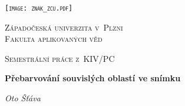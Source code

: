 \begin{titlepage}
    \centering
    {\scshape\texttt{[image: znak\_zcu.pdf]} \par}
    {\scshape\LARGE Západočeská univerzita v~Plzni\\ Fakulta aplikovaných věd \par}
    \vspace{1cm}
    {\scshape\Large Semestrální práce z~KIV/PC\par}
    \vspace{1.5cm}
    {\huge\bfseries Přebarvování souvislých oblastí ve snímku\par}
    \vspace{2cm}
    {\Large\itshape Oto Šťáva\par}
\end{titlepage}
